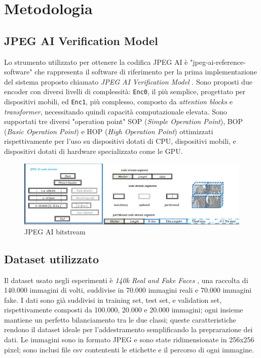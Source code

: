 \chapter{Metodologia}\label{ch:work}
\section{JPEG AI Verification Model}\label{sec:vm}
Lo strumento utilizzato per ottenere la codifica JPEG AI è "jpeg-ai-reference-software" \cite{jpeg-ai-ref-sw} che rappresenta il software di riferimento per la prima implementazione del sistema proposto chiamato \textit{JPEG AI Verification Model} \cite{wg1n100279}. Sono proposti due encoder con diversi livelli di complessità: \texttt{Enc0}, il più semplice, progettato per dispositivi mobili, ed \texttt{Enc1}, più complesso, composto da \textit{attention blocks} e\textit{ transformer}, necessitando quindi capacità computazionale elevata.
Sono supportati tre diversi "operation point" SOP (\textit{Simple Operation Point}), BOP (\textit{Basic Operation Point}) e HOP (\textit{High Operation Point}) ottimizzati rispettivamente per l'uso su dispositivi dotati di CPU, dispositivi mobili, e dispositivi dotati di hardware specializzato come le GPU.
\begin{figure}
    \centering
    \includegraphics[width=1\linewidth]{img/JPEG AI codestream.png}
    \caption{JPEG AI bitstream}
    \label{fig:bitstream}
\end{figure}
\section{Dataset utilizzato}\label{sec:dataset}
Il dataset usato negli esperimenti è \textit{140k Real and Fake Faces} \cite{140kRealFake}, una raccolta di 140.000 immagini di volti, suddivise in 70.000  immagini reali e 70.000 immagini fake.
I dati sono già suddivisi in training set, test set, e validation set, rispettivamente composti da 100.000, 20.000 e 20.000 immagini; ogni insieme mantiene un perfetto bilanciamento tra le due classi; queste caratteristiche rendono il dataset ideale per l'addestramento semplificando la preprarazione dei dati. Le immagini sono in formato JPEG e sono state ridimensionate in 256x256 pixel; sono inclusi file csv contententi le etichette e il percorso di ogni immagine.
